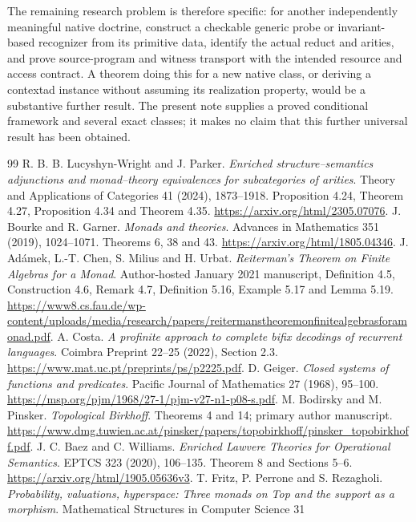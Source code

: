 \documentclass[11pt]{article}
\theoremstyle{definition}
\theoremstyle{remark}
\begin{document}
The remaining research problem is therefore specific: for another
independently meaningful native doctrine, construct a checkable generic
probe or invariant-based recognizer from its primitive data, identify the
actual reduct and arities, and prove source-program and witness transport
with the intended resource and access contract. A theorem doing this for
a new native class, or deriving a contextad instance without assuming its
realization property, would be a substantive further result. The present
note supplies a proved conditional framework and several exact classes;
it makes no claim that this further universal result has been obtained.

\begin{thebibliography}{99}
R. B. B. Lucyshyn-Wright and J. Parker.
\emph{Enriched structure--semantics adjunctions and monad--theory
equivalences for subcategories of arities}.
Theory and Applications of Categories 41 (2024), 1873--1918.
Proposition 4.24, Theorem 4.27, Proposition 4.34 and Theorem 4.35.
\url{https://arxiv.org/html/2305.07076}.
J. Bourke and R. Garner. \emph{Monads and theories}.
Advances in Mathematics 351 (2019), 1024--1071.
Theorems 6, 38 and 43.
\url{https://arxiv.org/html/1805.04346}.
J. Ad\'amek, L.-T. Chen, S. Milius and H. Urbat.
\emph{Reiterman's Theorem on Finite Algebras for a Monad}.
Author-hosted January 2021 manuscript, Definition 4.5, Construction 4.6,
Remark 4.7, Definition 5.16, Example 5.17 and Lemma 5.19.
\url{https://www8.cs.fau.de/wp-content/uploads/media/research/papers/reitermanstheoremonfinitealgebrasforamonad.pdf}.
A. Costa. \emph{A profinite approach to complete bifix decodings of
recurrent languages}. Coimbra Preprint 22--25 (2022), Section 2.3.
\url{https://www.mat.uc.pt/preprints/ps/p2225.pdf}.
D. Geiger. \emph{Closed systems of functions and predicates}.
Pacific Journal of Mathematics 27 (1968), 95--100.
\url{https://msp.org/pjm/1968/27-1/pjm-v27-n1-p08-s.pdf}.
M. Bodirsky and M. Pinsker. \emph{Topological Birkhoff}.
Theorems 4 and 14; primary author manuscript.
\url{https://www.dmg.tuwien.ac.at/pinsker/papers/topobirkhoff/pinsker_topobirkhoff.pdf}.
J. C. Baez and C. Williams.
\emph{Enriched Lawvere Theories for Operational Semantics}.
EPTCS 323 (2020), 106--135. Theorem 8 and Sections 5--6.
\url{https://arxiv.org/html/1905.05636v3}.
T. Fritz, P. Perrone and S. Rezagholi.
\emph{Probability, valuations, hyperspace: Three monads on Top and the
support as a morphism}. Mathematical Structures in Computer Science 31

\end{thebibliography}
\end{document}
